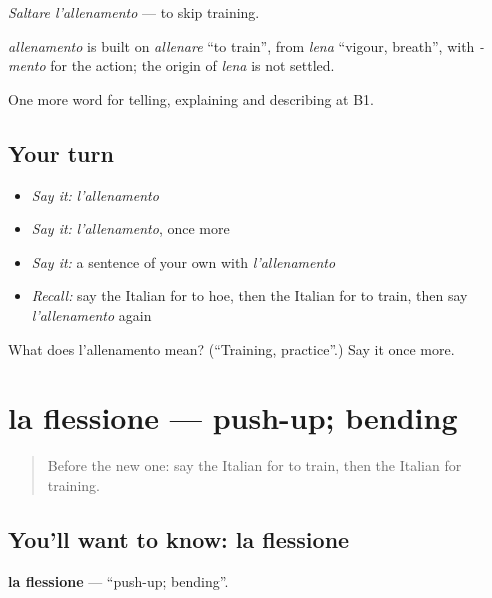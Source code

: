 \emph{Saltare l'allenamento} — to skip training.

\begin{cousinweb}
\emph{allenamento} is built on \emph{allenare} \textquotedblleft{}to train\textquotedblright{}, from \emph{lena} \textquotedblleft{}vigour, breath\textquotedblright{}, with \emph{-mento} for the action; the origin of \emph{lena} is not settled.
\end{cousinweb}

\begin{grammarlens}[title={What you've built}]
One more word for telling, explaining and describing at B1.
\end{grammarlens}

\subsection*{Your turn}
\begin{itemize}
\raggedright
  \item \emph{Say it:} \emph{l'allenamento}
  \item \emph{Say it:} \emph{l'allenamento}, once more
  \item \emph{Say it:} a sentence of your own with \emph{l'allenamento}
  \item \emph{Recall:} say the Italian for to hoe, then the Italian for to train, then say \emph{l'allenamento} again
\end{itemize}

\begin{tcolorbox}[breakable,colback=teal!4,colframe=teal!35!black,title={Before you move on}]
What does l'allenamento mean? (\textquotedblleft{}Training, practice\textquotedblright{}.) Say it once more.
\end{tcolorbox}
\section[la flessione]{la flessione — push-up; bending}

\label{lesson:IT-C508-flessione}



\begin{quote}
Before the new one: say the Italian for to train, then the Italian for training.
\end{quote}

\subsection*{You'll want to know: la flessione}
\textbf{la flessione} — \textquotedblleft{}push-up; bending\textquotedblright{}.


